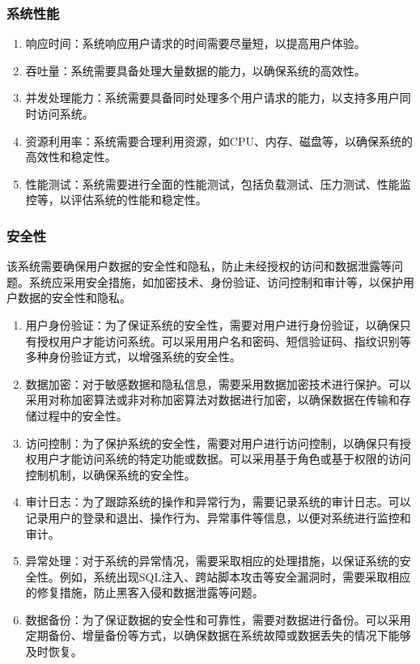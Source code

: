 \documentclass[UTF8]{ctexart}
\newcommand{\m}[1]{\textcolor{modify}{#1}}
\begin{document}
    \subsubsection{系统性能}
    \m{
        \begin{enumerate}
            \item 响应时间：系统响应用户请求的时间需要尽量短，以提高用户体验。
            \item 吞吐量：系统需要具备处理大量数据的能力，以确保系统的高效性。
            \item 并发处理能力：系统需要具备同时处理多个用户请求的能力，以支持多用户同时访问系统。
            \item 资源利用率：系统需要合理利用资源，如CPU、内存、磁盘等，以确保系统的高效性和稳定性。
            \item 性能测试：系统需要进行全面的性能测试，包括负载测试、压力测试、性能监控等，以评估系统的性能和稳定性。
        \end{enumerate}
    }
    \subsubsection{安全性}
    \par
    \m{该系统需要确保用户数据的安全性和隐私，防止未经授权的访问和数据泄露等问题。系统应采用安全措施，如加密技术、身份验证、访问控制和审计等，以保护用户数据的安全性和隐私。}
    \m{
        \begin{enumerate}
            \item 用户身份验证：为了保证系统的安全性，需要对用户进行身份验证，以确保只有授权用户才能访问系统。可以采用用户名和密码、短信验证码、指纹识别等多种身份验证方式，以增强系统的安全性。
            \item 数据加密：对于敏感数据和隐私信息，需要采用数据加密技术进行保护。可以采用对称加密算法或非对称加密算法对数据进行加密，以确保数据在传输和存储过程中的安全性。
            \item 访问控制：为了保护系统的安全性，需要对用户进行访问控制，以确保只有授权用户才能访问系统的特定功能或数据。可以采用基于角色或基于权限的访问控制机制，以确保系统的安全性。
            \item 审计日志：为了跟踪系统的操作和异常行为，需要记录系统的审计日志。可以记录用户的登录和退出、操作行为、异常事件等信息，以便对系统进行监控和审计。
            \item 异常处理：对于系统的异常情况，需要采取相应的处理措施，以保证系统的安全性。例如，系统出现SQL注入、跨站脚本攻击等安全漏洞时，需要采取相应的修复措施，防止黑客入侵和数据泄露等问题。
            \item 数据备份：为了保证数据的安全性和可靠性，需要对数据进行备份。可以采用定期备份、增量备份等方式，以确保数据在系统故障或数据丢失的情况下能够及时恢复。
        \end{enumerate}
    }
\end{document}
